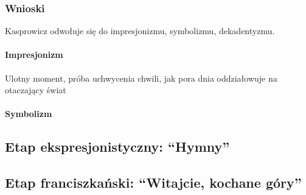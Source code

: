 \documentclass[a4paper]{article}
\begin{document}
\subsubsection{Wnioski}
Kasprowicz odwołuje się do impresjonizmu, symbolizmu, dekadentyzmu.
\paragraph{Impresjonizm}
Ulotny moment, próba uchwycenia chwili, jak pora dnia oddziałowuje na otaczający świat
\paragraph{Symbolizm}

\subsection{Etap ekspresjonistyczny: ``Hymny''}
\subsection{Etap franciszkański: ``Witajcie, kochane góry''}
\end{document}

